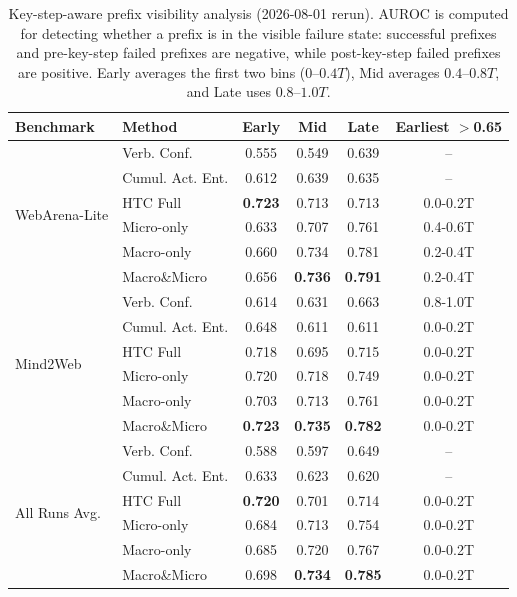 \begin{table}[t]
\centering
\small
\setlength{\tabcolsep}{4pt}
\renewcommand{\arraystretch}{1.08}
\begin{tabular}{llcccc}
\toprule
\textbf{Benchmark} & \textbf{Method} & \textbf{Early} & \textbf{Mid} & \textbf{Late} & \textbf{Earliest $>$0.65} \\
\midrule
\multirow{6}{*}{WebArena-Lite} & Verb. Conf. & 0.555 & 0.549 & 0.639 & -- \\
 & Cumul. Act. Ent. & 0.612 & 0.639 & 0.635 & -- \\
 & HTC Full & \textbf{0.723} & 0.713 & 0.713 & 0.0-0.2T \\
 & Micro-only & 0.633 & 0.707 & 0.761 & 0.4-0.6T \\
 & Macro-only & 0.660 & 0.734 & 0.781 & 0.2-0.4T \\
 & Macro\&Micro & 0.656 & \textbf{0.736} & \textbf{0.791} & 0.2-0.4T \\
\midrule
\multirow{6}{*}{Mind2Web} & Verb. Conf. & 0.614 & 0.631 & 0.663 & 0.8-1.0T \\
 & Cumul. Act. Ent. & 0.648 & 0.611 & 0.611 & 0.0-0.2T \\
 & HTC Full & 0.718 & 0.695 & 0.715 & 0.0-0.2T \\
 & Micro-only & 0.720 & 0.718 & 0.749 & 0.0-0.2T \\
 & Macro-only & 0.703 & 0.713 & 0.761 & 0.0-0.2T \\
 & Macro\&Micro & \textbf{0.723} & \textbf{0.735} & \textbf{0.782} & 0.0-0.2T \\
\midrule
\multirow{6}{*}{All Runs Avg.} & Verb. Conf. & 0.588 & 0.597 & 0.649 & -- \\
 & Cumul. Act. Ent. & 0.633 & 0.623 & 0.620 & -- \\
 & HTC Full & \textbf{0.720} & 0.701 & 0.714 & 0.0-0.2T \\
 & Micro-only & 0.684 & 0.713 & 0.754 & 0.0-0.2T \\
 & Macro-only & 0.685 & 0.720 & 0.767 & 0.0-0.2T \\
 & Macro\&Micro & 0.698 & \textbf{0.734} & \textbf{0.785} & 0.0-0.2T \\
\bottomrule
\end{tabular}
\caption{Key-step-aware prefix visibility analysis (2026-08-01 rerun). AUROC is computed for detecting whether a prefix is in the visible failure state: successful prefixes and pre-key-step failed prefixes are negative, while post-key-step failed prefixes are positive. Early averages the first two bins ($0$--$0.4T$), Mid averages $0.4$--$0.8T$, and Late uses $0.8$--$1.0T$.}
\label{tab:prefix_time}
\end{table}
